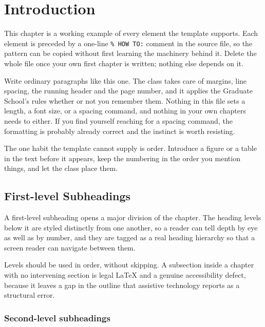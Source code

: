 \chapter{Introduction}

This chapter is a working example of every element the template supports. Each
element is preceded by a one-line \verb|% HOW TO:| comment in the source file,
so the pattern can be copied without first learning the machinery behind it.
Delete the whole file once your own first chapter is written; nothing else
depends on it.

Write ordinary paragraphs like this one. The class takes care of margins, line
spacing, the running header and the page number, and it applies the Graduate
School's rules whether or not you remember them. Nothing in this file sets a
length, a font size, or a spacing command, and nothing in your own chapters
needs to either. If you find yourself reaching for a spacing command, the
formatting is probably already correct and the instinct is worth resisting.

The one habit the template cannot supply is order. Introduce a figure or a
table in the text before it appears, keep the numbering in the order you
mention things, and let the class place them.

\section{First-level Subheadings}

A first-level subheading opens a major division of the chapter. The heading
levels below it are styled distinctly from one another, so a reader can tell
depth by eye as well as by number, and they are tagged as a real heading
hierarchy so that a screen reader can navigate between them.

Levels should be used in order, without skipping. A subsection inside a
chapter with no intervening section is legal LaTeX and a genuine accessibility
defect, because it leaves a gap in the outline that assistive technology
reports as a structural error.

\subsection{Second-level subheadings}

